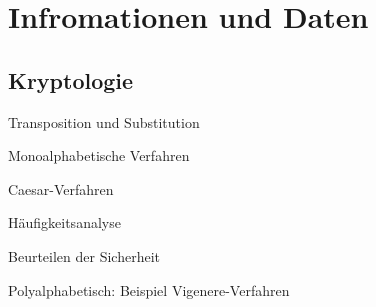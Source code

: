 \chapter{Infromationen und Daten}

\section{Kryptologie}

\startitemize[packed]
\item Transposition und Substitution
\item Monoalphabetische Verfahren
\startitemize[packed]
\item Caesar-Verfahren
\stopitemize
\item Häufigkeitsanalyse
\item Beurteilen der Sicherheit
\item Polyalphabetisch: Beispiel Vigenere-Verfahren
\item 
\stopitemize
